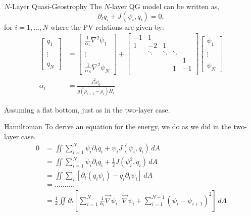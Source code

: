 \documentclass[12pt]{article}
\begin{document}
\newpage
\begin{section}{$N$-Layer Quasi-Geostrophy}
    The $N$-layer QG model can be written as,
    $$
    \partial_t q_i + J(\psi_i, q_i) = 0,
    $$
    for $i=1,...,N$ where the PV relations are given by:
    \begin{align*}
        \left[\begin{array}{c}
        q_1 \\
        \\
        \vdots \\
        \\
        q_N
        \end{array}\right]
        &=
        \left[\begin{array}{c}
        \frac{1}{\alpha_1}\nabla^2 \psi_1 \\
        \\
        \vdots \\
        \\
        \frac{1}{\alpha_N}\nabla^2 \psi_N
        \end{array}\right]
        +
        \left[\begin{array}{ccccc}
        -1 & 1 & & & \\
        1 & -2 & 1 & & \\
        & \ddots & \ddots & \ddots & \\
        & & & & 1 \\
        & & & 1 & -1\\
        \end{array}\right]
        \left[\begin{array}{c}
        \psi_1 \\
        \\
        \vdots \\
        \\
        \psi_N
        \end{array}\right] \\
        \alpha_i &= \frac{f_0^2 \rho_0}{g (\rho_{i+1} - \rho_i) H_i}
    \end{align*}

    Assuming a flat bottom, just as in the two-layer case.

    \begin{subsection}{Hamiltonian}
        To derive an equation for the energy, we do as we did in the two-layer case.
        \begin{align*}
        0 &= \iint \sum_{i=1}^N \psi_i \partial_t q_i + \psi_i J(\psi_i, q_i) \, dA \\
        &= \iint \sum_{i=1}^N \psi_i \partial_t q_i + \frac12 J(\psi_i^2, q_i) \, dA \\
        &= \iint \sum_i \left[\partial_t(q_i \psi_i) - q_i \partial_t\psi_i \right] \, dA \\
        &= .......... \\
        &= \frac12 \iint \partial_t \left[ \sum_{i=1}^N \frac{1}{\alpha_i} \vec\nabla \psi_i \cdot \vec\nabla \psi_i + \sum_{i=1}^{N-1} (\psi_i - \psi_{i+1})^2 \right]\, dA
        \end{align*}


\end{subsection}
\end{section}
\end{document}
